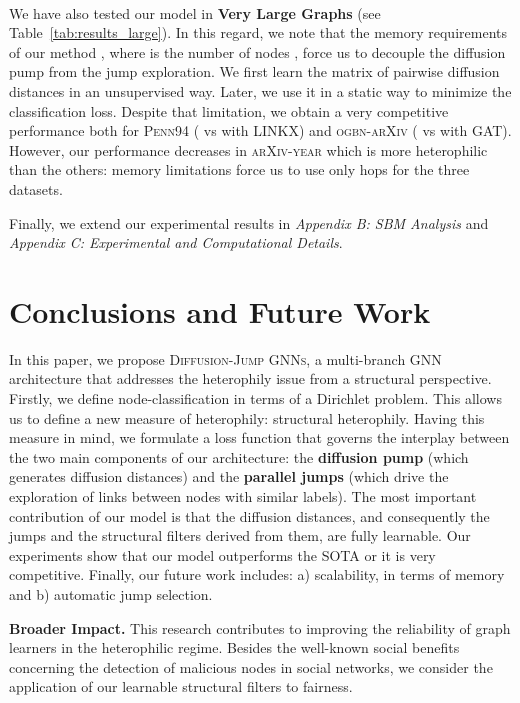 \documentclass{article}
\theoremstyle{plain}
\theoremstyle{definition}
\begin{document}
\\
We have also tested our model in \textbf{Very Large Graphs} (see Table~\ref{tab:results_large}). In this regard, we note that the memory requirements of our method  , where  is the number of nodes , force us to decouple the diffusion pump from the jump exploration. We first learn the matrix of pairwise diffusion distances in an unsupervised way. Later, we use it in a static way to minimize the classification loss. Despite that limitation, we obtain a very competitive performance both for \textsc{Penn94} ( vs  with \textsc{LINKX}) and  \textsc{ogbn-arXiv} ( vs  with \textsc{GAT}). However, our performance decreases in \textsc{arXiv-year} which is more heterophilic than the others: memory limitations force us to use only  hops for the three datasets. 

Finally, we extend our experimental results in \emph{Appendix B: SBM Analysis} and \emph{Appendix C: Experimental and Computational Details}.

\section{Conclusions and Future Work}\label{sec:6}
In this paper, we propose \textsc{Diffusion-Jump GNNs}, a multi-branch GNN architecture that addresses the heterophily issue from a structural perspective. Firstly, we define node-classification in terms of a Dirichlet problem. This allows us to define a new measure of heterophily: structural heterophily. Having this measure in mind, we formulate a loss function that governs the interplay between the two main components of our architecture: the \textbf{diffusion pump} (which generates diffusion distances) and the \textbf{parallel jumps} (which drive the exploration of links between nodes with similar labels). The most important contribution of our model is that the diffusion distances, and consequently the jumps and the structural filters derived from them, are fully learnable. Our experiments show that our model outperforms the SOTA or it is very competitive. Finally, our future work includes: a) scalability, in terms of memory and b) automatic jump selection. 

\textbf{Broader Impact.} This research contributes to improving the reliability of graph learners in the heterophilic regime. Besides the well-known social benefits concerning the detection of malicious nodes in social networks, we consider the application of our learnable structural filters to fairness.
\end{document}
